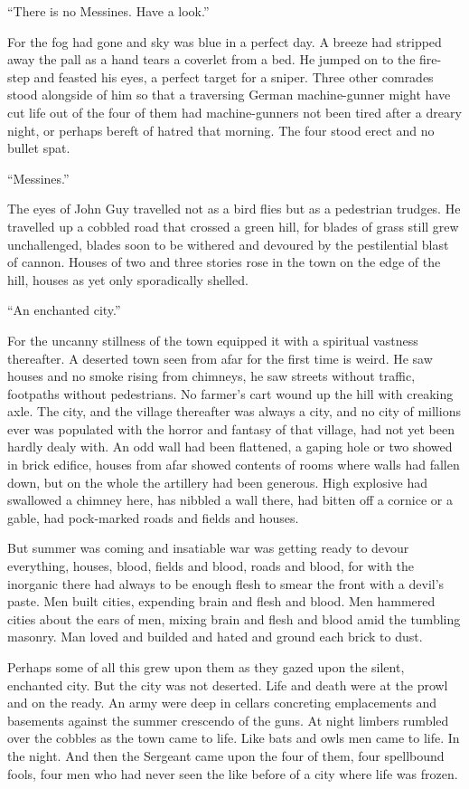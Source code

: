 ``There is no Messines. Have a look.''

For the fog had gone and sky was blue in a perfect day. A breeze had stripped away the pall as a hand tears a coverlet from a bed. He jumped on to the fire-step and feasted his eyes, a perfect target for a sniper. Three other comrades stood alongside of him so that a traversing German machine-gunner might have cut life out of the four of them had machine-gunners not been tired after a dreary night, or perhaps bereft of hatred that morning. The four stood erect and no bullet spat.

``Messines.''

The eyes of John Guy travelled not as a bird flies but as a pedestrian trudges. He travelled up a cobbled road that crossed  a green hill, for blades of grass still grew unchallenged, blades soon to be withered and devoured by the pestilential blast of cannon. Houses of two and three stories rose in the town on the edge of the hill, houses as yet only sporadically shelled.

``An enchanted city.''

For the uncanny stillness of the town equipped it with a spiritual vastness thereafter. A deserted town seen from afar for the first time is weird. He saw houses and no smoke rising from chimneys, he saw streets without traffic, footpaths without pedestrians. No farmer's cart wound up the hill with creaking axle. The city, and the village thereafter was always a city, and no city of millions ever was populated with the horror and fantasy of that village, had not yet been hardly dealy with. An odd wall had been flattened, a gaping hole or two showed in brick edifice, houses from afar showed contents of rooms where walls had fallen down, but on the whole the artillery had been generous. High explosive had swallowed a chimney here, has nibbled a wall there, had bitten off a cornice or a gable, had pock-marked roads and fields and houses.

But summer was coming and insatiable war was getting ready to devour everything, houses, blood, fields and blood, roads and blood, for with the inorganic there had always to be enough flesh to smear the front with a devil's paste. Men built cities, expending brain and flesh and blood. Men hammered cities about the ears of men, mixing brain and flesh and blood amid the tumbling masonry. Man loved and builded and hated and ground each brick to dust.

Perhaps some of all this grew upon them as they gazed upon the silent, enchanted city. But the city was not deserted. Life and death were at the prowl and on the ready. An army were deep in cellars concreting emplacements and basements against the summer crescendo of the guns. At night limbers rumbled over the cobbles as the town came to life. Like bats and owls men came to life. In the night. And then the Sergeant came upon the four of them, four spellbound fools, four men who had never seen the like before of a city where life was frozen.

